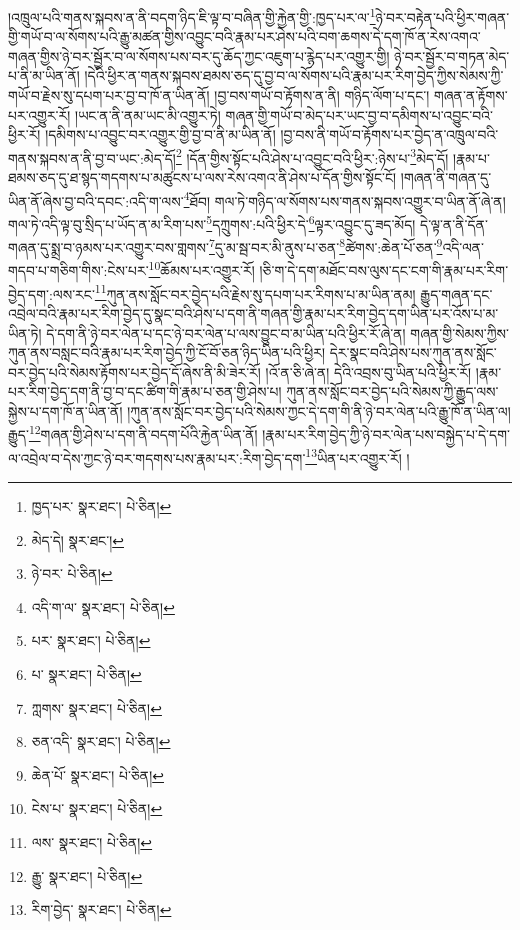 །འཁྲུལ་པའི་གནས་སྐབས་ན་ནི་བདག་ཉིད་ཇི་ལྟ་བ་བཞིན་གྱི་རྐྱེན་གྱི་:ཁྱད་པར་ལ་\footnote{ཁྱད་པར་  སྣར་ཐང་།  པེ་ཅིན། }ཉེ་བར་བརྟེན་པའི་ཕྱིར་གཞན་གྱི་གཡོ་བ་ལ་སོགས་པའི་རྒྱུ་མཚན་གྱིས་འབྱུང་བའི་རྣམ་པར་ཤེས་པའི་བག་ཆགས་དེ་དག་ཁོ་ན་རེས་འགའ་གཞན་གྱིས་ཉེ་བར་སྦྱོར་བ་ལ་སོགས་པས་བར་དུ་ཆོད་ཀྱང་འཇུག་པ་རྙེད་པར་འགྱུར་གྱི། ཉེ་བར་སྦྱོར་བ་གཏན་མེད་པ་ནི་མ་ཡིན་ནོ། །དེའི་ཕྱིར་ན་གནས་སྐབས་ཐམས་ཅད་དུ་བྱ་བ་ལ་སོགས་པའི་རྣམ་པར་རིག་བྱེད་ཀྱིས་སེམས་ཀྱི་གཡོ་བ་རྗེས་སུ་དཔག་པར་བྱ་བ་ཁོ་ན་ཡིན་ནོ། །བྱ་བས་གཡོ་བ་རྟོགས་ན་ནི། གཉིད་ལོག་པ་དང་། གཞན་ན་རྟོགས་པར་འགྱུར་རོ། །ཡང་ན་ནི་ནམ་ཡང་མི་འགྱུར་ཏེ། གཞན་གྱི་གཡོ་བ་མེད་པར་ཡང་བྱ་བ་དམིགས་པ་འབྱུང་བའི་ཕྱིར་རོ། །དམིགས་པ་འབྱུང་བར་འགྱུར་གྱི་བྱ་བ་ནི་མ་ཡིན་ནོ། །བྱ་བས་ནི་གཡོ་བ་རྟོགས་པར་བྱེད་ན་འཁྲུལ་བའི་གནས་སྐབས་ན་ནི་བྱ་བ་ཡང་:མེད་དོ།\footnote{མེད་དེ།  སྣར་ཐང་། } །དོན་གྱིས་སྟོང་པའི་ཤེས་པ་འབྱུང་བའི་ཕྱིར་:ཉེས་པ་\footnote{ཉེ་བར་  པེ་ཅིན། }མེད་དོ། །རྣམ་པ་ཐམས་ཅད་དུ་ཐ་སྙད་གདགས་པ་མཚུངས་པ་ལས་རེས་འགའ་ནི་ཤེས་པ་དོན་གྱིས་སྟོང་ངོ། །གཞན་ནི་གཞན་དུ་ཡིན་ནོ་ཞེས་བྱ་བའི་དབང་:འདི་ག་ལས་\footnote{འདི་ག་ལ་  སྣར་ཐང་།  པེ་ཅིན། }ཐོབ། གལ་ཏེ་གཉིད་ལ་སོགས་པས་གནས་སྐབས་འགྱུར་བ་ཡིན་ནོ་ཞེ་ན། གལ་ཏེ་འདི་ལྟ་བུ་སྲིད་པ་ཡོད་ན་མ་རིག་པས་\footnote{པར་  སྣར་ཐང་།  པེ་ཅིན། }དཀྲུགས་:པའི་ཕྱིར་དེ་\footnote{པ་  སྣར་ཐང་།  པེ་ཅིན། }ལྟར་འབྱུང་དུ་ཟད་མོད། དེ་ལྟ་ན་ནི་དོན་གཞན་དུ་སྨྲ་བ་ཉམས་པར་འགྱུར་བས་གླགས་\footnote{ཀླགས་  སྣར་ཐང་།  པེ་ཅིན། }དུ་མ་སྦ་བར་མི་ནུས་པ་ཅན་\footnote{ཅན་འདི་  སྣར་ཐང་།  པེ་ཅིན། }ཚེགས་:ཆེན་པོ་ཅན་\footnote{ཆེན་པོ་  སྣར་ཐང་།  པེ་ཅིན། }འདི་ལན་གདབ་པ་གཅིག་གིས་:ངེས་པར་\footnote{ངེས་པ་  སྣར་ཐང་།  པེ་ཅིན། }ཆོམས་པར་འགྱུར་རོ། །ཅི་ག་དེ་དག་མཐོང་བས་ལུས་དང་ངག་གི་རྣམ་པར་རིག་བྱེད་དག་:ལས་རང་\footnote{ལས་  སྣར་ཐང་།  པེ་ཅིན། }ཀུན་ནས་སློང་བར་བྱེད་པའི་རྗེས་སུ་དཔག་པར་རིགས་པ་མ་ཡིན་ནམ། རྒྱུད་གཞན་དང་འབྲེལ་བའི་རྣམ་པར་རིག་བྱེད་དུ་སྣང་བའི་ཤེས་པ་དག་ནི་གཞན་གྱི་རྣམ་པར་རིག་བྱེད་དག་ཡིན་པར་འོས་པ་མ་ཡིན་ཏེ། དེ་དག་ནི་ཉེ་བར་ལེན་པ་དང་ཉེ་བར་ལེན་པ་ལས་བྱུང་བ་མ་ཡིན་པའི་ཕྱིར་རོ་ཞེ་ན། གཞན་གྱི་སེམས་ཀྱིས་ཀུན་ནས་བསླང་བའི་རྣམ་པར་རིག་བྱེད་ཀྱི་ངོ་བོ་ཅན་ཉིད་ཡིན་པའི་ཕྱིར། དེར་སྣང་བའི་ཤེས་པས་ཀུན་ནས་སློང་བར་བྱེད་པའི་སེམས་རྟོགས་པར་བྱེད་དོ་ཞེས་ནི་མི་ཟེར་རོ། །འོ་ན་ཅི་ཞེ་ན། དེའི་འབྲས་བུ་ཡིན་པའི་ཕྱིར་རོ། །རྣམ་པར་རིག་བྱེད་དག་ནི་བྱ་བ་དང་ཚིག་གི་རྣམ་པ་ཅན་གྱི་ཤེས་པ། ཀུན་ནས་སློང་བར་བྱེད་པའི་སེམས་ཀྱི་རྒྱུད་ལས་སྐྱེས་པ་དག་ཁོ་ན་ཡིན་ནོ། །ཀུན་ནས་སློང་བར་བྱེད་པའི་སེམས་ཀྱང་དེ་དག་གི་ནི་ཉེ་བར་ལེན་པའི་རྒྱུ་ཁོ་ན་ཡིན་ལ། རྒྱུད་\footnote{རྒྱུ་  སྣར་ཐང་།  པེ་ཅིན། }གཞན་གྱི་ཤེས་པ་དག་ནི་བདག་པོའི་རྐྱེན་ཡིན་ནོ། །རྣམ་པར་རིག་བྱེད་ཀྱི་ཉེ་བར་ལེན་པས་བསྐྱེད་པ་དེ་དག་ལ་འབྲེལ་བ་དེས་ཀྱང་ཉེ་བར་གདགས་པས་རྣམ་པར་:རིག་བྱེད་དག་\footnote{རིག་བྱེད་  སྣར་ཐང་།  པེ་ཅིན། }ཡིན་པར་འགྱུར་རོ། །
